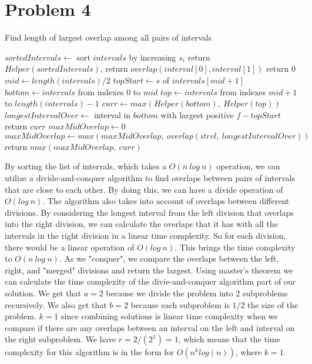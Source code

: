 \documentclass[12pt]{article}
\begin{document}
\section*{Problem 4}
\begin{algorithm}
\caption{Find length of largest overlap among all pairs of intervals}
\begin{algorithmic}[1]
    \State $sortedIntervals \gets $ sort $intervals$ by increasing $s_i$
    \State return $Helper(sortedIntervals)$, 
\EndFunction
\State
{}
        \State return $overlap(interval[0], interval[1])$
    \EndIf
        \State return $0$
    \EndIf
    \State $mid \gets length(intervals) / 2$ 
    \State $topStart \gets s$ of $intervals[mid + 1]$ 
    \State $bottom \gets intervals$ from indexes $0$ to $mid$
    \State $top \gets intervals$ from indexes $mid+1$ to $length(intervals) - 1$
    \State
    \State $curr \gets max(Helper(bottom),\ Helper(top))$
    \State $longestIntervalOver \gets $ interval in $bottom$ with largest positive $f - topStart$
        \State return $curr$
    \EndIf
    \State
    \State $maxMidOverlap \gets 0$
        \State $maxMidOverlap \gets max(maxMidOverlap,\ overlap(itrvl,\ longestIntervalOver))$
    \EndFor
    \State return $max(maxMidOverlap,\ curr)$
\EndFunction
\end{algorithmic}
\end{algorithm}
By sorting the list of intervals, which takes a $O(n\ log\ n)$ operation, we can utilize a divide-and-conquer
algorithm to find overlaps between pairs of intervals that are close to each other. By doing this, we can
have a divide operation of $O(log\ n)$. The algorithm also takes into account of overlaps between different 
divisions. By considering the longest interval from the left division that overlaps into the right division,
we can calculate the overlaps that it has with all the intervals in the right division in a linear time complexity.
So for each division, there would be a linear operation of $O(log\ n)$. This brings the time complexity to 
$O(n\ log\ n)$. As we "conquer", we compare the overlaps between the left, right, and "merged" divisions and 
return the largest.
\newline
\newline
Using master's theorem we can calculate the time complexity of the divie-and-conquer algorithm part of our solution.
We get that $a=2$ because we divide the problem into 2 subproblems recursively. We also get that $b=2$ because each 
subproblem is $1/2$ the size of the problem. $k=1$ since combining solutions is linear time complexity when we compare
if there are any overlaps between an interval on the left and interval on the right subproblem. We have $r=2/(2^1)=1$, 
which means that the time complexity for this algorithm is in the form for 
$O(n^klog(n))$, where $k=1$.
\end{document}
